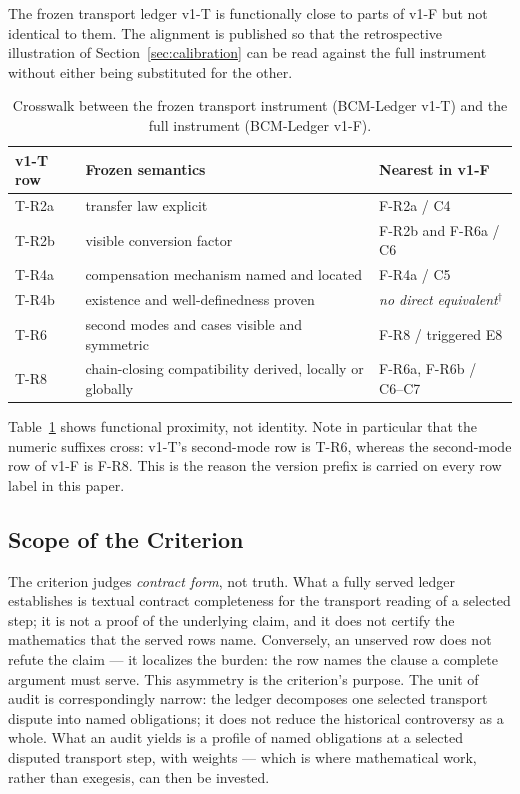 \documentclass[11pt,a4paper]{article}
\begin{document}
The frozen transport ledger v1-T is functionally close to parts of v1-F but not
identical to them. The alignment is published so that the retrospective
illustration of Section~\ref{sec:calibration} can be read against the full
instrument without either being substituted for the other.

\begin{table}[htbp]
\centering
\caption{Crosswalk between the frozen transport instrument (BCM-Ledger v1-T) and the full instrument (BCM-Ledger v1-F).}
\label{tab:crosswalk_v1t_v1f}
\begin{tabularx}{\textwidth}{@{}l X l@{}}
\toprule
v1-T row & Frozen semantics & Nearest in v1-F \\
\midrule
T-R2a & transfer law explicit & F-R2a / C4 \\
T-R2b & visible conversion factor & F-R2b and F-R6a / C6 \\
T-R4a & compensation mechanism named and located & F-R4a / C5 \\
T-R4b & existence and well-definedness proven & \emph{no direct
  equivalent}$^{\dagger}$ \\
T-R6 & second modes and cases visible and symmetric & F-R8 / triggered E8 \\
T-R8 & chain-closing compatibility derived, locally or globally
  & F-R6a, F-R6b / C6--C7 \\
\bottomrule
\end{tabularx}
\end{table}


\noindent
Table~\ref{tab:crosswalk_v1t_v1f} shows functional proximity, not identity. Note in particular that the
numeric suffixes cross: v1-T's second-mode row is T-R6, whereas the second-mode
row of v1-F is F-R8. This is the reason the version prefix is carried on every
row label in this paper.

\subsection{Scope of the Criterion}\label{sec:scope}

The criterion judges \emph{contract form}, not truth. What a fully served
ledger establishes is textual contract completeness for the transport reading
of a selected step; it is not a proof of the underlying claim, and it does not
certify the mathematics that the served rows name. Conversely, an unserved row
does not refute the claim --- it localizes the burden: the row names the clause
a complete argument must serve. This asymmetry is the criterion's purpose. The
unit of audit is correspondingly narrow: the ledger decomposes one selected
transport dispute into named obligations; it does not reduce the historical
controversy as a whole. What an audit yields is a profile of named obligations
at a selected disputed transport step, with weights --- which is where
mathematical work, rather than exegesis, can then be invested.
\end{document}
